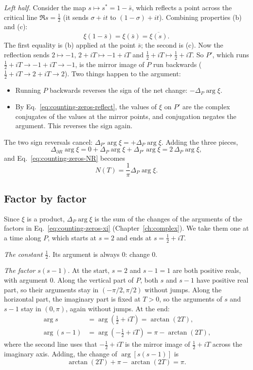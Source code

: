 \emph{Left half.} Consider the map $s\mapsto s^*=1-\bar s$, which reflects a point across the critical line $\Re s=\tfrac12$ (it sends $\sigma+it$ to $(1-\sigma)+it$). Combining properties (b) and (c):
\begin{equation}
\xi(1-\bar s)=\xi(\bar s)=\overline{\xi(s)}.
\label{eq:counting-zeros-reflect}
\end{equation}
The first equality is (b) applied at the point $\bar s$; the second is (c). Now the reflection sends $2\mapsto-1$, $2+iT\mapsto-1+iT$ and $\tfrac12+iT\mapsto\tfrac12+iT$. So $P'$, which runs $\tfrac12+iT\to-1+iT\to-1$, is the mirror image of $P$ run backwards ($\tfrac12+iT\to2+iT\to2$). Two things happen to the argument:
\begin{itemize}
\item Running $P$ backwards reverses the sign of the net change: $-\Delta_P\arg\xi$.
\item By Eq.~\eqref{eq:counting-zeros-reflect}, the values of $\xi$ on $P'$ are the complex conjugates of the values at the mirror points, and conjugation negates the argument. This reverses the sign again.
\end{itemize}
The two sign reversals cancel: $\Delta_{P'}\arg\xi=+\Delta_P\arg\xi$. Adding the three pieces,
\begin{equation}
\Delta_{\partial R}\arg\xi=0+\Delta_P\arg\xi+\Delta_{P'}\arg\xi=2\,\Delta_P\arg\xi,
\end{equation}
and Eq.~\eqref{eq:counting-zeros-NR} becomes
\begin{equation}
N(T)=\frac{1}{\pi}\Delta_P\arg\xi.
\label{eq:counting-zeros-NP}
\end{equation}

\subsection{Factor by factor}

Since $\xi$ is a product, $\Delta_P\arg\xi$ is the sum of the changes of the arguments of the factors in Eq.~\eqref{eq:counting-zeros-xi} (Chapter~\ref{ch:complex}). We take them one at a time along $P$, which starts at $s=2$ and ends at $s=\tfrac12+iT$.

\emph{The constant $\tfrac12$.} Its argument is always 0: change $0$.

\emph{The factor $s(s-1)$.} At the start, $s=2$ and $s-1=1$ are both positive reals, with argument 0. Along the vertical part of $P$, both $s$ and $s-1$ have positive real part, so their arguments stay in $(-\pi/2,\pi/2)$ without jumps. Along the horizontal part, the imaginary part is fixed at $T>0$, so the arguments of $s$ and $s-1$ stay in $(0,\pi)$, again without jumps. At the end:
\begin{align*}
\arg s&=\arg\!\left(\tfrac12+iT\right)=\arctan(2T),\\
\arg(s-1)&=\arg\!\left(-\tfrac12+iT\right)=\pi-\arctan(2T),
\end{align*}
where the second line uses that $-\tfrac12+iT$ is the mirror image of $\tfrac12+iT$ across the imaginary axis. Adding, the change of $\arg[s(s-1)]$ is
\begin{equation}
\arctan(2T)+\pi-\arctan(2T)=\pi.
\end{equation}


